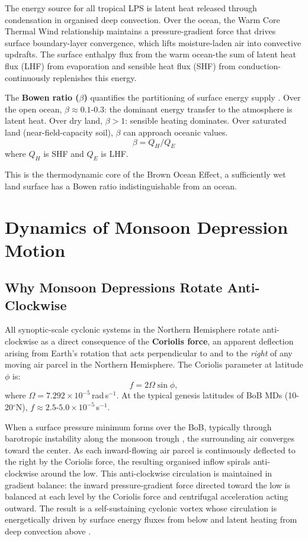 The energy source for all tropical LPS is latent heat released
through condensation in organised deep convection. Over the ocean,
the Warm Core Thermal Wind relationship maintains a pressure-gradient
force that drives surface boundary-layer convergence, which lifts
moisture-laden air into convective updrafts.
The surface enthalpy flux from the warm ocean-the sum of latent heat
flux (LHF) from evaporation and sensible heat flux (SHF) from
conduction-continuously replenishes this energy.

The \textbf{Bowen ratio ($\beta$)} quantifies the partitioning of
surface energy supply \citep{trenberth2009earth}. Over the open ocean,
$\beta \approx 0.1$-$0.3$: the dominant energy transfer to the atmosphere
is latent heat. Over dry land, $\beta > 1$: sensible heating dominates.
Over saturated land (near-field-capacity soil), $\beta$ can approach
oceanic values.
\begin{equation}
  \beta = Q_H / Q_E
\end{equation}
where $Q_H$ is SHF and $Q_E$ is LHF.

This is the thermodynamic core of the Brown Ocean Effect, a sufficiently
wet land surface has a Bowen ratio indistinguishable from an ocean.

\section{Dynamics of Monsoon Depression Motion}
\label{sec:md_dynamics}

\subsection{Why Monsoon Depressions Rotate Anti-Clockwise}
\label{subsec:md_anticlockwise}

All synoptic-scale cyclonic systems in the Northern Hemisphere rotate
anti-clockwise as a direct consequence of the \textbf{Coriolis force},
an apparent deflection arising from Earth's rotation that acts perpendicular
to and to the \emph{right} of any moving air parcel in the Northern Hemisphere.
The Coriolis parameter at latitude $\phi$ is:
\begin{equation}
  f = 2\Omega\sin\phi,
  \label{eq:coriolis_bg}
\end{equation}
where $\Omega = 7.292 \times 10^{-5}$\,rad\,s$^{-1}$. At the typical genesis
latitudes of BoB MDs (10-20$^\circ$N), $f \approx 2.5$-$5.0 \times
10^{-5}$\,s$^{-1}$.

When a surface pressure minimum forms over the BoB, typically through
barotropic instability along the monsoon trough \citep{mishra2021monsoon},
the surrounding air converges toward the center. As each
inward-flowing air parcel is continuously deflected to the right by
the Coriolis force, the resulting organised inflow spirals
anti-clockwise around the low. This anti-clockwise circulation is
maintained in gradient balance: the inward pressure-gradient
force directed toward the low is balanced at each level by the
Coriolis force and centrifugal acceleration acting outward. The
result is a self-sustaining cyclonic vortex whose circulation is
energetically driven by surface energy fluxes from below and latent
heating from deep convection above \citep{holton2004introduction}.

